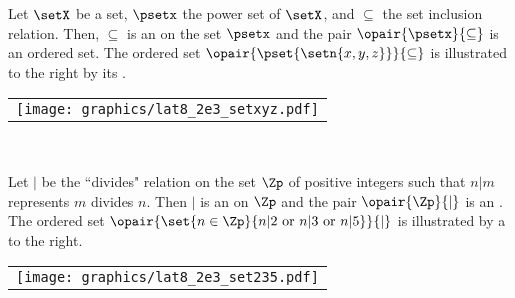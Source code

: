 \begin{minipage}{\tw-43mm}\raggedright%
\begin{example}
\label{ex:poset_xyz}
\footnotemark
Let $\setX$ be a set, $\psetx$ the power set of $\setX$,
and $\subseteq$ the set inclusion relation.
Then, $\subseteq$ is an  on the set $\psetx$
and the pair $\opair{\psetx}{\subseteq}$ is an ordered set.
The ordered set $\opair{\pset{\setn{x,y,z}}}{\subseteq}$ is illustrated 
to the right by its .
\end{example}%
\end{minipage}%
%
\hfill\begin{tabular}{c}\texttt{[image: graphics/lat8\_2e3\_setxyz.pdf]}\end{tabular}\hfill\mbox{}\\%

\begin{minipage}{\tw-43mm}%
\begin{example}%
\label{ex:poset_532}
\footnotemark
Let $|$ be the ``divides" relation on the set $\Zp$ of positive integers such that
$n|m$ represents $m$ divides $n$.
Then $|$ is an  on $\Zp$
and the pair $\opair{\Zp}{|}$ is an .
The ordered set
$\opair{\set{n\in\Zp}{n|2 \text{ or } n|3 \text{ or } n|5}}{|}$
is illustrated by a  to the right.
\end{example}%
\end{minipage}%
%
\hfill\begin{tabular}{c}\texttt{[image: graphics/lat8\_2e3\_set235.pdf]}\end{tabular}\hfill\mbox{}\\%

